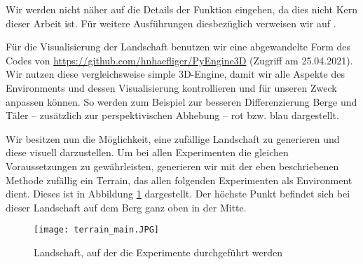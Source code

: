 Wir werden nicht näher auf die Details der Funktion eingehen, da dies nicht Kern dieser Arbeit ist. Für weitere Ausführungen diesbezüglich verweisen wir auf \cite{archer2011procedurally}.

Für die Visualisierung der Landschaft benutzen wir eine abgewandelte Form des Codes von \url{https://github.com/hnhaefliger/PyEngine3D} (Zugriff am 25.04.2021). Wir nutzen diese vergleichsweise simple 3D-Engine, damit wir alle Aspekte des Environments und dessen Visualisierung kontrollieren und für unseren Zweck anpassen können. So werden zum Beispiel zur besseren Differenzierung Berge und Täler -- zusätzlich zur perspektivischen Abhebung -- rot bzw. blau dargestellt.

Wir besitzen nun die Möglichkeit, eine zufällige Landschaft zu generieren und diese visuell darzustellen. Um bei allen Experimenten die gleichen Voraussetzungen zu gewährleisten, generieren wir mit der eben beschriebenen Methode zufällig ein Terrain, das allen folgenden Experimenten als Environment dient. Dieses ist in Abbildung \ref{img:terrainMain} dargestellt. Der höchste Punkt befindet sich bei dieser Landschaft auf dem Berg ganz oben in der Mitte.

\begin{figure}[h!]
    \centering
    \texttt{[image: terrain\_main.JPG]}
    \caption{Landschaft, auf der die Experimente durchgeführt werden} \label{img:terrainMain}
\end{figure}
